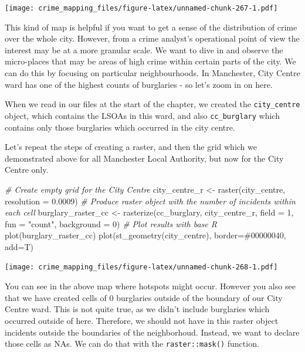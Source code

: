 \documentclass[
  krantz2]{krantz}
\makeatletter
\newenvironment{Shaded}{\begin{snugshade}}{\end{snugshade}}
\newcommand{\AttributeTok}[1]{\textcolor[rgb]{0.61,0.61,0.61}{#1}}
\newcommand{\CommentTok}[1]{\textcolor[rgb]{0.37,0.37,0.37}{\textit{#1}}}
\newcommand{\DecValTok}[1]{\textcolor[rgb]{0.06,0.06,0.06}{#1}}
\newcommand{\FloatTok}[1]{\textcolor[rgb]{0.06,0.06,0.06}{#1}}
\newcommand{\FunctionTok}[1]{\textcolor[rgb]{0,0,0}{#1}}
\newcommand{\NormalTok}[1]{#1}
\newcommand{\OtherTok}[1]{\textcolor[rgb]{0.37,0.37,0.37}{#1}}
\newcommand{\StringTok}[1]{\textcolor[rgb]{0.5,0.5,0.5}{#1}}
\newenvironment{kframe}{%
\medskip{}
\setlength{\fboxsep}{.8em}
 \def\at@end@of@kframe{}%
 \ifinner\ifhmode%
  \def\at@end@of@kframe{\end{minipage}}%
  \begin{minipage}{\columnwidth}%
 \fi\fi%
 \def\FrameCommand##1{\hskip\@totalleftmargin \hskip-\fboxsep
 \colorbox{shadecolor}{##1}\hskip-\fboxsep
     \hskip-\linewidth \hskip-\@totalleftmargin \hskip\columnwidth}%
 \MakeFramed {\advance\hsize-\width
   \@totalleftmargin\z@ \linewidth\hsize
   \@setminipage}}%
 {\par\unskip\endMakeFramed%
 \at@end@of@kframe}
\renewenvironment{Shaded}{\begin{kframe}}{\end{kframe}}
\makeatother
\begin{document}
\texttt{[image: crime\_mapping\_files/figure-latex/unnamed-chunk-267-1.pdf]}

This kind of map is helpful if you want to get a sense of the distribution of crime over the whole city. However, from a crime analyst's operational point of view the interest may be at a more granular scale. We want to dive in and observe the micro-places that may be areas of high crime within certain parts of the city. We can do this by focusing on particular neighbourhoods. In Manchester, City Centre ward has one of the highest counts of burglaries - so let's zoom in on here.

When we read in our files at the start of the chapter, we created the \texttt{city\_centre} object, which contains the LSOAs in this ward, and also \texttt{cc\_burglary} which contains only those burglaries which occurred in the city centre.

Let's repeat the steps of creating a raster, and then the grid which we demonstrated above for all Manchester Local Authority, but now for the City Centre only.

\begin{Shaded}
\begin{Highlighting}[]
\CommentTok{\# Create empty grid for the City Centre}
\NormalTok{city\_centre\_r }\OtherTok{\textless{}{-}} \FunctionTok{raster}\NormalTok{(city\_centre, }\AttributeTok{resolution =} \FloatTok{0.0009}\NormalTok{)}
\CommentTok{\# Produce raster object with the number of incidents within each cell}
\NormalTok{burglary\_raster\_cc }\OtherTok{\textless{}{-}} \FunctionTok{rasterize}\NormalTok{(cc\_burglary,}
\NormalTok{                                city\_centre\_r,}
                                \AttributeTok{field =} \DecValTok{1}\NormalTok{,}
                                \AttributeTok{fun =} \StringTok{"count"}\NormalTok{,}
                                \AttributeTok{background =} \DecValTok{0}\NormalTok{)}
\CommentTok{\# Plot results with base R}
\FunctionTok{plot}\NormalTok{(burglary\_raster\_cc)}
\FunctionTok{plot}\NormalTok{(}\FunctionTok{st\_geometry}\NormalTok{(city\_centre), }\AttributeTok{border=}\StringTok{\textquotesingle{}\#00000040\textquotesingle{}}\NormalTok{, }\AttributeTok{add=}\NormalTok{T)}
\end{Highlighting}
\end{Shaded}

\texttt{[image: crime\_mapping\_files/figure-latex/unnamed-chunk-268-1.pdf]}

You can see in the above map where hotspots might occur. However you also see that we have created cells of 0 burglaries outside of the boundary of our City Centre ward. This is not quite true, as we didn't include burglaries which occurred outside of here. Therefore, we should not have in this raster object incidents outside the boundaries of the neighborhoud. Instead, we want to declare those cells as NAs. We can do that with the \texttt{raster::mask()} function.
\end{document}
